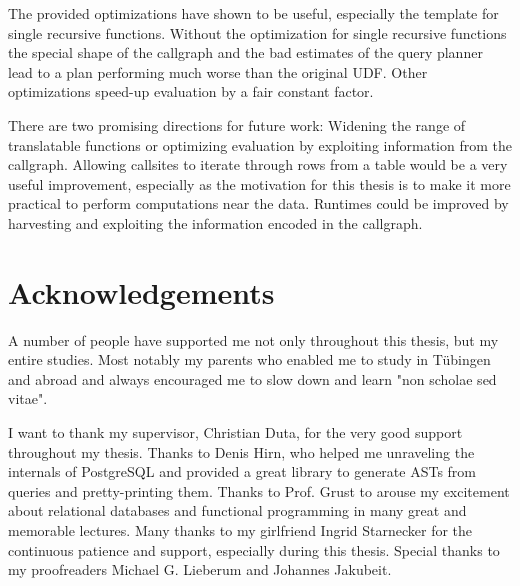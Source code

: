 The provided optimizations have shown to be useful, especially the template for single recursive functions. Without the optimization for single recursive functions the special shape of the callgraph and the bad estimates of the query planner lead to a plan performing much worse than the original UDF. Other optimizations speed-up evaluation by a fair constant factor.

There are two promising directions for future work: Widening the range of translatable functions or optimizing evaluation by exploiting information from the callgraph. Allowing callsites to iterate through rows from a table would be a very useful improvement, especially as the motivation for this thesis is to make it more practical to perform computations near the data. Runtimes could be improved by harvesting and exploiting the information encoded in the callgraph.

\section*{Acknowledgements}
A number of people have supported me not only throughout this thesis, but my entire studies. Most notably my parents who enabled me to study in Tübingen and abroad and always encouraged me to slow down and learn "non scholae sed vitae".

I want to thank my supervisor, Christian Duta, for the very good support throughout my thesis. Thanks to Denis Hirn, who helped me unraveling the internals of PostgreSQL and provided a great library to generate ASTs from queries and pretty-printing them. Thanks to Prof. Grust to arouse my excitement about relational databases and functional programming in many great and memorable lectures. 
Many thanks to my girlfriend Ingrid Starnecker for the continuous patience and support, especially during this thesis. Special thanks to my proofreaders Michael G. Lieberum and Johannes Jakubeit.